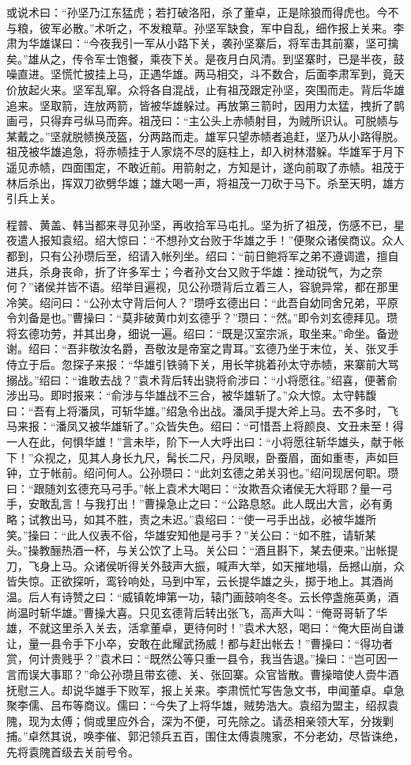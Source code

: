 或说术曰：“孙坚乃江东猛虎；若打破洛阳，杀了董卓，正是除狼而得虎也。今不与粮，彼军必散。”术听之，不发粮草。孙坚军缺食，军中自乱，细作报上关来。李肃为华雄谋曰：“今夜我引一军从小路下关，袭孙坚寨后，将军击其前寨，坚可擒矣。”雄从之，传令军士饱餐，乘夜下关。是夜月白风清。到坚寨时，已是半夜，鼓噪直进。坚慌忙披挂上马，正遇华雄。两马相交，斗不数合，后面李肃军到，竟天价放起火来。坚军乱窜。众将各自混战，止有祖茂跟定孙坚，突围而走。背后华雄追来。坚取箭，连放两箭，皆被华雄躲过。再放第三箭时，因用力太猛，拽折了鹊画弓，只得弃弓纵马而奔。祖茂曰：“主公头上赤帻射目，为贼所识认。可脱帻与某戴之。”坚就脱帻换茂盔，分两路而走。雄军只望赤帻者追赶，坚乃从小路得脱。祖茂被华雄追急，将赤帻挂于人家烧不尽的庭柱上，却入树林潜躲。华雄军于月下遥见赤帻，四面围定，不敢近前。用箭射之，方知是计，遂向前取了赤帻。祖茂于林后杀出，挥双刀欲劈华雄；雄大喝一声，将祖茂一刀砍于马下。杀至天明，雄方引兵上关。

程普、黄盖、韩当都来寻见孙坚，再收拾军马屯扎。坚为折了祖茂，伤感不已，星夜遣人报知袁绍。绍大惊曰：“不想孙文台败于华雄之手！”便聚众诸侯商议。众人都到，只有公孙瓒后至，绍请入帐列坐。绍曰：“前日鲍将军之弟不遵调遣，擅自进兵，杀身丧命，折了许多军士；今者孙文台又败于华雄：挫动锐气，为之奈何？”诸侯并皆不语。绍举目遍视，见公孙瓒背后立着三人，容貌异常，都在那里冷笑。绍问曰：“公孙太守背后何人？”瓒呼玄德出曰：“此吾自幼同舍兄弟，平原令刘备是也。”曹操曰：“莫非破黄巾刘玄德乎？”瓒曰：“然。”即令刘玄德拜见。瓒将玄德功劳，并其出身，细说一遍。绍曰：“既是汉室宗派，取坐来。”命坐。备逊谢。绍曰：“吾非敬汝名爵，吾敬汝是帝室之胄耳。”玄德乃坐于末位，关、张叉手侍立于后。忽探子来报：“华雄引铁骑下关，用长竿挑着孙太守赤帻，来寨前大骂搦战。”绍曰：“谁敢去战？”袁术背后转出骁将俞涉曰：“小将愿往。”绍喜，便著俞涉出马。即时报来：“俞涉与华雄战不三合，被华雄斩了。”众大惊。太守韩馥曰：“吾有上将潘凤，可斩华雄。”绍急令出战。潘凤手提大斧上马。去不多时，飞马来报：“潘凤又被华雄斩了。”众皆失色。绍曰：“可惜吾上将颜良、文丑未至！得一人在此，何惧华雄！”言未毕，阶下一人大呼出曰：“小将愿往斩华雄头，献于帐下！”众视之，见其人身长九尺，髯长二尺，丹凤眼，卧蚕眉，面如重枣，声如巨钟，立于帐前。绍问何人。公孙瓒曰：“此刘玄德之弟关羽也。”绍问现居何职。瓒曰：“跟随刘玄德充马弓手。”帐上袁术大喝曰：“汝欺吾众诸侯无大将耶？量一弓手，安敢乱言！与我打出！”曹操急止之曰：“公路息怒。此人既出大言，必有勇略；试教出马，如其不胜，责之未迟。”袁绍曰：“使一弓手出战，必被华雄所笑。”操曰：“此人仪表不俗，华雄安知他是弓手？”关公曰：“如不胜，请斩某头。”操教酾热酒一杯，与关公饮了上马。关公曰：“酒且斟下，某去便来。”出帐提刀，飞身上马。众诸侯听得关外鼓声大振，喊声大举，如天摧地塌，岳撼山崩，众皆失惊。正欲探听，鸾铃响处，马到中军，云长提华雄之头，掷于地上。其酒尚温。后人有诗赞之曰：“威镇乾坤第一功，辕门画鼓响冬冬。云长停盏施英勇，酒尚温时斩华雄。”曹操大喜。只见玄德背后转出张飞，高声大叫：“俺哥哥斩了华雄，不就这里杀入关去，活拿董卓，更待何时！”袁术大怒，喝曰：“俺大臣尚自谦让，量一县令手下小卒，安敢在此耀武扬威！都与赶出帐去！”曹操曰：“得功者赏，何计贵贱乎？”袁术曰：“既然公等只重一县令，我当告退。”操曰：“岂可因一言而误大事耶？”命公孙瓒且带玄德、关、张回寨。众官皆散。曹操暗使人赍牛酒抚慰三人。却说华雄手下败军，报上关来。李肃慌忙写告急文书，申闻董卓。卓急聚李儒、吕布等商议。儒曰：“今失了上将华雄，贼势浩大。袁绍为盟主，绍叔袁隗，现为太傅；倘或里应外合，深为不便，可先除之。请丞相亲领大军，分拨剿捕。”卓然其说，唤李催、郭汜领兵五百，围住太傅袁隗家，不分老幼，尽皆诛绝，先将袁隗首级去关前号令。


